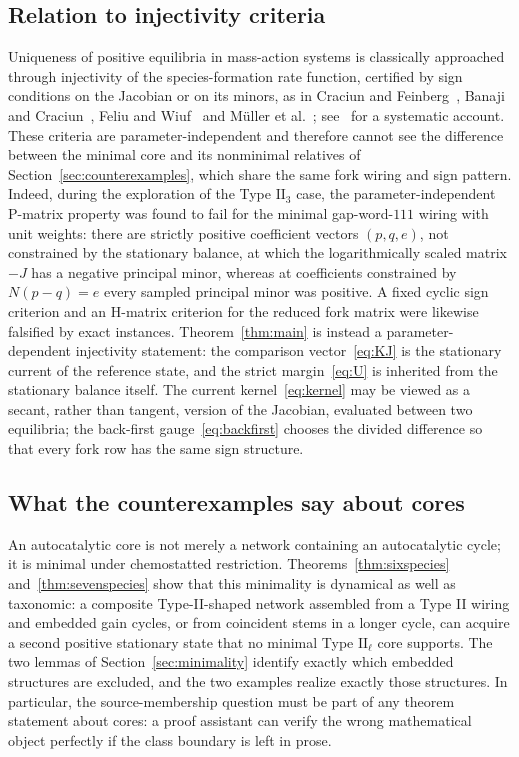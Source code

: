 \documentclass[11pt,reqno]{amsart}
\theoremstyle{plain}
\theoremstyle{definition}
\theoremstyle{remark}
\numberwithin{equation}{section}
\begin{document}
\subsection{Relation to injectivity criteria}
Uniqueness of positive equilibria in mass-action systems is classically approached through injectivity of the species-formation rate function, certified by sign conditions on the Jacobian or on its minors, as in Craciun and Feinberg~\cite{CF05}, Banaji and Craciun~\cite{BC10}, Feliu and Wiuf~\cite{FW12} and M\"uller et al.~\cite{MFRCSD16}; see~\cite{Fei19} for a systematic account.  These criteria are parameter-independent and therefore cannot see the difference between the minimal core and its nonminimal relatives of Section~\ref{sec:counterexamples}, which share the same fork wiring and sign pattern.  Indeed, during the exploration of the Type $\mathrm{II}_3$ case, the parameter-independent P-matrix property was found to fail for the minimal gap-word-$111$ wiring with unit weights: there are strictly positive coefficient vectors $(p,q,e)$, not constrained by the stationary balance, at which the logarithmically scaled matrix $-J$ has a negative principal minor, whereas at coefficients constrained by $N(p-q)=e$ every sampled principal minor was positive.  A fixed cyclic sign criterion and an H-matrix criterion for the reduced fork matrix were likewise falsified by exact instances.  Theorem~\ref{thm:main} is instead a parameter-dependent injectivity statement: the comparison vector~\eqref{eq:KJ} is the stationary current of the reference state, and the strict margin~\eqref{eq:U} is inherited from the stationary balance itself.  The current kernel~\eqref{eq:kernel} may be viewed as a secant, rather than tangent, version of the Jacobian, evaluated between two equilibria; the back-first gauge~\eqref{eq:backfirst} chooses the divided difference so that every fork row has the same sign structure.

\subsection{What the counterexamples say about cores}
An autocatalytic core is not merely a network containing an autocatalytic cycle; it is minimal under chemostatted restriction.  Theorems~\ref{thm:sixspecies} and~\ref{thm:sevenspecies} show that this minimality is dynamical as well as taxonomic: a composite Type-II-shaped network assembled from a Type II wiring and embedded gain cycles, or from coincident stems in a longer cycle, can acquire a second positive stationary state that no minimal Type $\mathrm{II}_\ell$ core supports.  The two lemmas of Section~\ref{sec:minimality} identify exactly which embedded structures are excluded, and the two examples realize exactly those structures.  In particular, the source-membership question must be part of any theorem statement about cores: a proof assistant can verify the wrong mathematical object perfectly if the class boundary is left in prose.
\end{document}
